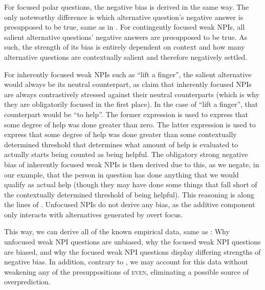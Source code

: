 For focused polar questions, the negative bias is derived in the same way. The only noteworthy difference is which alternative question's negative answer is presupposed to be true, same as in \textcite{Jeong2021,Jeong2022}. 
For contingently focused weak NPIs, all salient alternative questions' negative answers are presupposed to be true. As such, the strength of its bias is entirely dependent on context and how many alternative questions are contextually salient and therefore negatively settled.

For inherently focused weak NPIs such as \enquote{lift a finger}, the salient alternative would always be its neutral counterpart, as \textcite{Jeong2021,Jeong2022} claim that inherently focused NPIs are always contrastively stressed against their neutral counterparts (which is why they are obligatorily focused in the first place). In the case of \enquote{lift a finger}, that counterpart would be \enquote{to help}. The former expression is used to express that some degree of help was done greater than zero. The latter expression is used to express that some degree of help was done greater than some contextually determined threshold that determines what amount of help is evaluated to actually starts being counted as being helpful. The obligatory strong negative bias of inherently focused weak NPIs is then derived due to this, as we negate, in our example, that the person in question has done anything that we would qualify as actual help (though they may have done some things that fall short of the contextually determined threshold of being helpful). This reasoning is along the lines of \textcite{vanRooij2003}. Unfocused NPIs do not derive any bias, as the additive component only interacts with alternatives generated by overt focus. 

This way, we can derive all of the known empirical data, same as \textcite{Jeong2021,Jeong2022}: Why unfocused weak NPI questions are unbiased, why the focused weak NPI questions are biased, and why the focused weak NPI questions display differing strengths of negative bias. In addition, contrary to \textcite{Jeong2021,Jeong2022}, we may account for this data without weakening any of the presuppositions of {\scshape even}, eliminating a possible source of overprediction.

